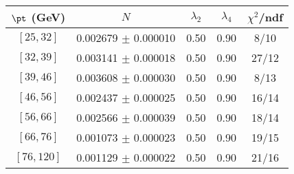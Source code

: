 \begin{tabular}{c||c|c|c|c}
$\pt$ (GeV) & $N$ & $\lambda_{2}$ & $\lambda_4$  & $\chi^2$/ndf  \\
\hline
$[25, 32]$ & 0.002679 $\pm$ 0.000010 & 0.50 & 0.90 & 8/10\\
$[32, 39]$ & 0.003141 $\pm$ 0.000018 & 0.50 & 0.90 & 27/12\\
$[39, 46]$ & 0.003608 $\pm$ 0.000030 & 0.50 & 0.90 & 8/13\\
$[46, 56]$ & 0.002437 $\pm$ 0.000025 & 0.50 & 0.90 & 16/14\\
$[56, 66]$ & 0.002566 $\pm$ 0.000039 & 0.50 & 0.90 & 18/14\\
$[66, 76]$ & 0.001073 $\pm$ 0.000023 & 0.50 & 0.90 & 19/15\\
$[76, 120]$ & 0.001129 $\pm$ 0.000022 & 0.50 & 0.90 & 21/16\\
\end{tabular}
